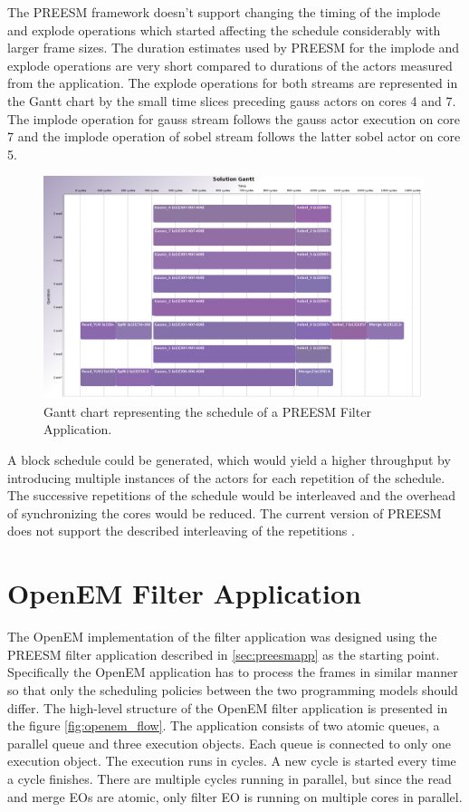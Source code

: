 The PREESM framework doesn't support changing the timing of the implode and explode operations which started affecting the schedule considerably with larger frame sizes. The duration estimates used by PREESM for the implode and explode operations are very short compared to durations of the actors measured from the application. The explode operations for both streams are represented in the Gantt chart by the small time slices preceding gauss actors on cores 4 and 7. The implode operation for gauss stream follows the gauss actor execution on core 7 and the implode operation of sobel stream follows the latter sobel actor on core 5.

\begin{figure}[h!]
    \begin{center}
        \includegraphics[width=0.99\textwidth]{images/gantt_preesm_cifcif.png}
        \caption{Gantt chart representing the schedule of a PREESM Filter Application.}
        \label{fig:preesm_gantt}
    \end{center}
\end{figure}

A block schedule could be generated, which would yield a higher throughput by introducing multiple instances of the actors for each repetition of the schedule. The successive repetitions of the schedule would be interleaved and the overhead of synchronizing the cores would be reduced. The current version of PREESM does not support the described interleaving of the repetitions \cite{pelcat2014preesm}.

\section{OpenEM Filter Application}
\label{sec:oemapp}
The OpenEM implementation of the filter application was designed using the PREESM filter application described in \ref{sec:preesmapp} as the starting point. Specifically the OpenEM application has to process the frames in similar manner so that only the scheduling policies between the two programming models should differ. The high-level structure of the OpenEM filter application is presented in the figure \ref{fig:openem_flow}. The application consists of two atomic queues, a parallel queue and three execution objects. Each queue is connected to only one execution object. The execution runs in cycles. A new cycle is started every time a cycle finishes. There are multiple cycles running in parallel, but since the read and merge EOs are atomic, only filter EO is running on multiple cores in parallel.

